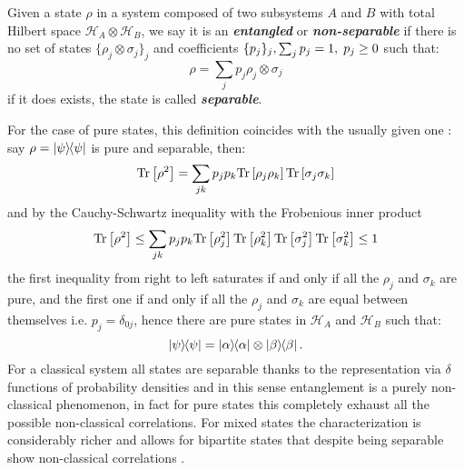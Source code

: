 \begin{definition}
  Given a state $\rho$ in a system composed of two subsystems $A$ and $B$ with total Hilbert space $\mathcal{H}_{A}\otimes \mathcal{H}_{B}$, we say it is
  an \textbf{\textit{entangled}} or \textit{\textbf{non-separable}} if there is no set of states $\{\rho_{j}\otimes \sigma_{j}\}_{j}$ and coefficients
  $\{p_{j}\}_{j},  \sum_{j}p_{j}=1, \hspace{0.1cm} p_{j}\geq 0$ such that:
  \begin{equation}
    \rho = \sum_{j}p_{j}\rho_{j}\otimes \sigma_{j}
  \end{equation}
  if it does exists, the state is called \textbf{\textit{separable}}.
\end{definition}
For the case of pure states, this definition coincides with the usually given one \cite{nielsen_quantum_2010}: say $\rho=\ketbra{\psi}$ is pure and separable, then:
\begin{equation}
  \mathrm{Tr}\left[\rho^{2}\right] = \sum_{jk}p_{j}p_{k}\mathrm{Tr}\left[\rho_{j}\rho_{k}\right]\mathrm{Tr}\left[\sigma_{j}\sigma_{k}\right]
\end{equation}
and by the Cauchy-Schwartz inequality with the Frobenious inner product
\begin{equation}
  \mathrm{Tr}\left[\rho^{2}\right] \leq \sum_{jk}p_{j}p_{k}\mathrm{Tr}\left[\rho_{j}^{2}\right]\mathrm{Tr}\left[\rho_{k}^{2}\right]\mathrm{Tr}\left[\sigma_{j}^{2}\right]\mathrm{Tr}\left[\sigma_{k}^{2}\right] \leq 1
\end{equation}
the first inequality from right to left saturates if and only if all the $\rho_{j}$ and $\sigma_{k}$ are pure, and the first one if
and only if all the $\rho_{j}$ and $\sigma_{k}$ are equal between themselves i.e. $p_{j}=\delta_{0j}$, hence there are pure states
in $\mathcal{H}_{A}$ and $\mathcal{H}_{B}$ such that:
\begin{equation}
  \ketbra{\psi} = \ketbra{\alpha}\otimes\ketbra{\beta}.
\end{equation}
For a classical system all states are separable thanks to the representation via $\delta$ functions
of probability densities \cite{diosi_short_2011} and in this sense entanglement is a purely non-classical phenomenon, in fact for pure states
this completely exhaust all the possible non-classical correlations. For mixed states the characterization is considerably richer
and allows for bipartite states that despite being separable show non-classical correlations \cite{adesso2016introduction}.
